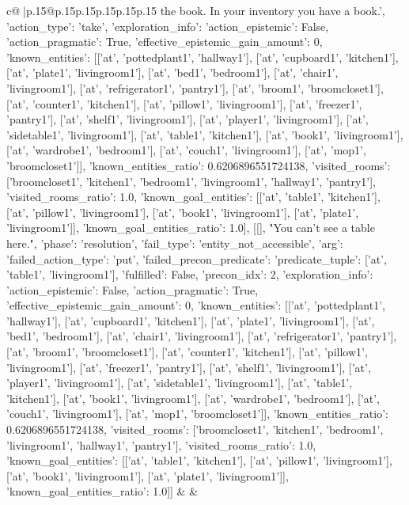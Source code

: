 \documentclass{article}
\begin{document}
{\begin{supertabular}{c@{$\;$}|p{.15\linewidth}@{}p{.15\linewidth}p{.15\linewidth}p{.15\linewidth}p{.15\linewidth}p{.15\linewidth}}
{{{the book. In your inventory you have a book.', {'action_type': 'take', 'exploration_info': {'action_epistemic': False, 'action_pragmatic': True, 'effective_epistemic_gain_amount': 0, 'known_entities': [['at', 'pottedplant1', 'hallway1'], ['at', 'cupboard1', 'kitchen1'], ['at', 'plate1', 'livingroom1'], ['at', 'bed1', 'bedroom1'], ['at', 'chair1', 'livingroom1'], ['at', 'refrigerator1', 'pantry1'], ['at', 'broom1', 'broomcloset1'], ['at', 'counter1', 'kitchen1'], ['at', 'pillow1', 'livingroom1'], ['at', 'freezer1', 'pantry1'], ['at', 'shelf1', 'livingroom1'], ['at', 'player1', 'livingroom1'], ['at', 'sidetable1', 'livingroom1'], ['at', 'table1', 'kitchen1'], ['at', 'book1', 'livingroom1'], ['at', 'wardrobe1', 'bedroom1'], ['at', 'couch1', 'livingroom1'], ['at', 'mop1', 'broomcloset1']], 'known_entities_ratio': 0.6206896551724138, 'visited_rooms': ['broomcloset1', 'kitchen1', 'bedroom1', 'livingroom1', 'hallway1', 'pantry1'], 'visited_rooms_ratio': 1.0, 'known_goal_entities': [['at', 'table1', 'kitchen1'], ['at', 'pillow1', 'livingroom1'], ['at', 'book1', 'livingroom1'], ['at', 'plate1', 'livingroom1']], 'known_goal_entities_ratio': 1.0}}], [[], "You can't see a table here.", {'phase': 'resolution', 'fail_type': 'entity_not_accessible', 'arg': {'failed_action_type': 'put', 'failed_precon_predicate': {'predicate_tuple': ['at', 'table1', 'livingroom1'], 'fulfilled': False, 'precon_idx': 2}}, 'exploration_info': {'action_epistemic': False, 'action_pragmatic': True, 'effective_epistemic_gain_amount': 0, 'known_entities': [['at', 'pottedplant1', 'hallway1'], ['at', 'cupboard1', 'kitchen1'], ['at', 'plate1', 'livingroom1'], ['at', 'bed1', 'bedroom1'], ['at', 'chair1', 'livingroom1'], ['at', 'refrigerator1', 'pantry1'], ['at', 'broom1', 'broomcloset1'], ['at', 'counter1', 'kitchen1'], ['at', 'pillow1', 'livingroom1'], ['at', 'freezer1', 'pantry1'], ['at', 'shelf1', 'livingroom1'], ['at', 'player1', 'livingroom1'], ['at', 'sidetable1', 'livingroom1'], ['at', 'table1', 'kitchen1'], ['at', 'book1', 'livingroom1'], ['at', 'wardrobe1', 'bedroom1'], ['at', 'couch1', 'livingroom1'], ['at', 'mop1', 'broomcloset1']], 'known_entities_ratio': 0.6206896551724138, 'visited_rooms': ['broomcloset1', 'kitchen1', 'bedroom1', 'livingroom1', 'hallway1', 'pantry1'], 'visited_rooms_ratio': 1.0, 'known_goal_entities': [['at', 'table1', 'kitchen1'], ['at', 'pillow1', 'livingroom1'], ['at', 'book1', 'livingroom1'], ['at', 'plate1', 'livingroom1']], 'known_goal_entities_ratio': 1.0}}]] 
	  } 
	   } 
	   } 
	 & & \\ 
 


\end{supertabular}}
\end{document}
